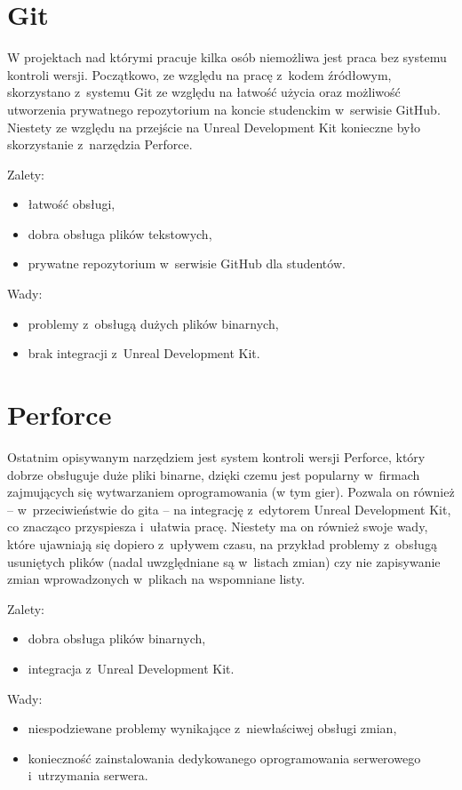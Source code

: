 \section{Git}

W projektach nad którymi pracuje kilka osób niemożliwa jest praca bez systemu kontroli wersji. Początkowo, ze względu na pracę z~kodem źródłowym, skorzystano z~systemu Git ze względu na łatwość użycia oraz możliwość utworzenia prywatnego repozytorium na koncie studenckim w~serwisie GitHub. Niestety ze względu na przejście na Unreal Development Kit konieczne było skorzystanie z~narzędzia Perforce.\\

{\raggedright Zalety:
\begin{itemize}
\item łatwość obsługi,
\item dobra obsługa plików tekstowych,
\item prywatne repozytorium w~serwisie GitHub dla studentów.
\end{itemize}

Wady:
\begin{itemize}
\item problemy z~obsługą dużych plików binarnych,
\item brak integracji z~Unreal Development Kit.
\end{itemize}
}

\section{Perforce}

Ostatnim opisywanym narzędziem jest system kontroli wersji Perforce, który dobrze obsługuje duże pliki binarne, dzięki czemu jest popularny w~firmach zajmujących się wytwarzaniem oprogramowania (w tym gier). Pozwala on również -- w~przeciwieństwie do gita -- na integrację z~edytorem Unreal Development Kit, co znacząco przyspiesza i~ułatwia pracę. Niestety ma on również swoje wady, które ujawniają się dopiero z~upływem czasu, na przykład problemy z~obsługą usuniętych plików (nadal uwzględniane są w~listach zmian) czy nie zapisywanie zmian wprowadzonych w~plikach na wspomniane listy.

{\raggedright Zalety:
\begin{itemize}
\item dobra obsługa plików binarnych,
\item integracja z~Unreal Development Kit.
\end{itemize}

Wady:
\begin{itemize}
\item niespodziewane problemy wynikające z~niewłaściwej obsługi zmian,
\item konieczność zainstalowania dedykowanego oprogramowania serwerowego i~utrzymania serwera.
\end{itemize}
}

